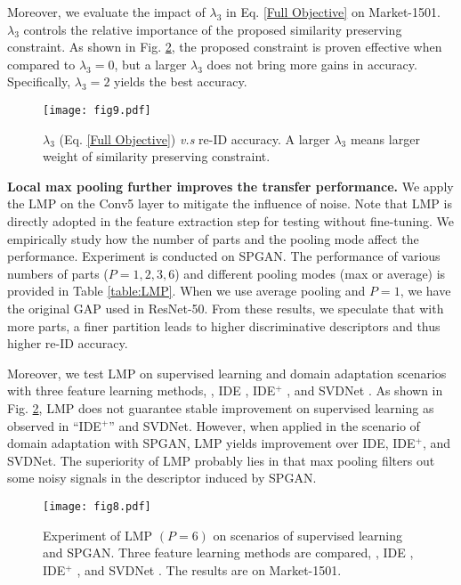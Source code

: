 \documentclass[10pt,twocolumn,letterpaper]{article}
\begin{document}
Moreover, we evaluate the impact of $\lambda_{3}$ in Eq. \ref{Full Objective} on Market-1501. $\lambda_{3}$ controls the relative importance of the proposed similarity preserving constraint. As shown in Fig. \ref{fig:fig8}, the proposed  constraint is proven effective when compared to $\lambda_{3}=0$, but a larger $\lambda_{3}$ does not bring more gains in accuracy. Specifically, $\lambda_{3}=2$ yields the best accuracy.
\begin{figure}[t]
\setlength{\abovecaptionskip}{-0.2cm} 
\setlength{\belowcaptionskip}{-0.2cm}
\begin{center}
\texttt{[image: fig9.pdf]}
\end{center}
\caption{$\lambda_{3}$ (Eq. \ref{Full Objective}) \emph{v.s} re-ID accuracy. A larger $\lambda_{3}$ means larger weight of  similarity preserving constraint.}
\label{fig:fig8}
\end{figure}

\textbf{Local max pooling further improves the transfer performance.} We apply the LMP on the Conv5 layer to mitigate the influence of noise. Note that LMP is directly adopted in the feature extraction step for testing without fine-tuning. We empirically study how the number of parts and the pooling mode affect the performance. Experiment is conducted on SPGAN. The performance of various numbers of parts ($P = 1, 2, 3, 6$) and different pooling modes (max or average) is provided in Table \ref{table:LMP}. When we use average pooling and $P=1$, we have the original GAP used in ResNet-50. From these results, we speculate that with more parts, a finer partition leads to higher discriminative descriptors and thus higher re-ID accuracy. 

Moreover, we test LMP on supervised learning and domain adaptation scenarios with three feature learning methods, \ie, IDE \cite{DBLP:journals/corr/ZhengYH16}, IDE$^+$ \cite{zhong2017re}, and SVDNet \cite{SVD}. As shown in Fig. \ref{fig:fig8}, LMP does not guarantee stable improvement on supervised learning as observed in ``IDE$^+$'' and SVDNet. However, when applied in the scenario of domain adaptation with SPGAN, LMP yields improvement over IDE, IDE$^+$, and SVDNet.
The superiority of LMP probably lies in that max pooling filters out some noisy signals in the descriptor induced by SPGAN.
\begin{figure}[t]
\setlength{\abovecaptionskip}{-0.2cm} 
\setlength{\belowcaptionskip}{-0.2cm}
\begin{center}
\texttt{[image: fig8.pdf]}
\end{center}
\caption{Experiment of LMP $(P=6)$ on scenarios of supervised learning and SPGAN. Three feature learning methods are compared, \ie, IDE \cite{DBLP:journals/corr/ZhengYH16}, IDE$^+$ \cite{zhong2017re}, and SVDNet \cite{SVD}. The results are on Market-1501.}
\label{fig:fig8}
\end{figure}
\end{document}
